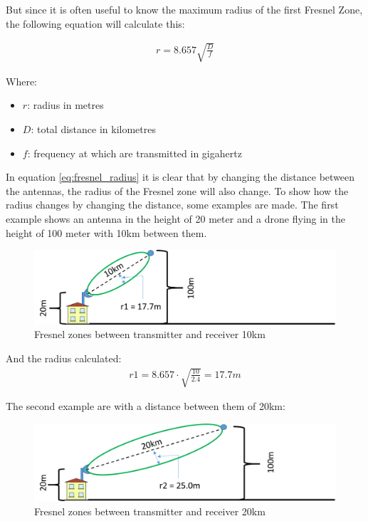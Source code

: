 But since it is often useful to know the maximum radius of the first Fresnel Zone, the following equation will calculate this:

\begin{align}
r= 8.657 \sqrt{\frac{D}{f}} \label{eq:fresnel_radius}
\end{align}

Where:
\begin{itemize}[label=]
    \item $r$: radius in metres
    \item $D$: total distance in kilometres
    \item $f$: frequency at which are transmitted in gigahertz
\end{itemize}

In equation \ref{eq:fresnel_radius} it is clear that by changing the distance between the antennas, the radius of the Fresnel zone will also change. To show how the radius changes by changing the distance, some examples are made. The first example shows an antenna in the height of 20 meter and a drone flying in the height of 100 meter with 10km between them.

\begin{figure}[h]
	\centering
	\includegraphics[scale=0.50]{figures/Fresnel_10km.png}
	\caption{Fresnel zones between transmitter and receiver 10km}
	\label{fig:fresnel_zones_10km}
\end{figure}  

And the radius calculated:
\begin{align*}
r1 = 8.657\cdot \sqrt{\frac{10}{2.4}} = 17.7m
\end{align*}

The second example are with a distance between them of 20km:

\begin{figure}[h]
	\centering
	\includegraphics[scale=0.50]{figures/Fresnel_20km.png}
	\caption{Fresnel zones between transmitter and receiver 20km}
	\label{fig:fresnel_zones_20km}
\end{figure}  

